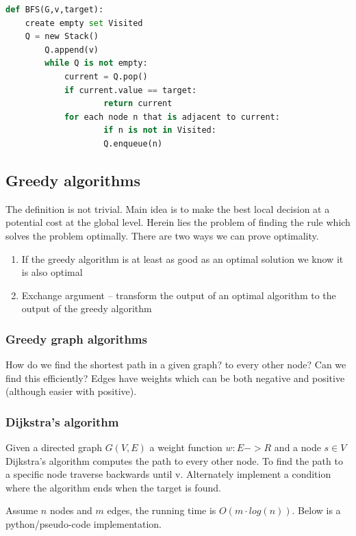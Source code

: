 \documentclass[12pt]{article} %
\begin{document}
\begin{lstlisting}[language=Python, caption=BFS in Python/pseudo]
def BFS(G,v,target):
    create empty set Visited
    Q = new Stack()
        Q.append(v)                      
        while Q is not empty:
            current = Q.pop()
            if current.value == target:
                    return current
            for each node n that is adjacent to current:
                    if n is not in Visited:
                    Q.enqueue(n)
\end{lstlisting}

\subsection{Greedy algorithms} %
The definition is not trivial. Main idea is to make the best local decision at a potential cost at the global level. Herein lies the problem of finding the rule which solves the problem optimally. There are two ways we can prove optimality. 
\begin{enumerate}
\item If the greedy algorithm is at least as good as an optimal solution we know it is also optimal
\item Exchange argument -- transform the output of an optimal algorithm to the output of the greedy algorithm
\end{enumerate}

\subsubsection{Greedy graph algorithms}
How do we find the shortest path in a given graph? to every other node? Can we find this efficiently? Edges have weights which can be both negative and positive (although easier with positive).

\subsubsection{Dijkstra's algorithm}
Given a directed graph $G(V, E)$ a weight function $w: E -> R$ and a node $s \in V$ Dijkstra's algorithm computes the path to every other node. To find the path to a specific node traverse backwards until v. Alternately implement a condition where the algorithm ends when the target is found.
\par Assume $n$ nodes and $m$ edges, the running time is $O(m \cdot log(n))$. Below is a python/pseudo-code implementation.
\end{document}
